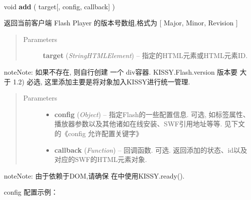 \documentclass[letterpaper,10pt,english]{sphinxmanual}
\begin{document}
\begin{fulllineitems}
\label{api/component/flash/flash-embed:flash.add}~
\begin{DUlineblock}{0em}
\item[] void \textbf{add} ( target{[}, config, callback{]} )
\item[] 返回当前客户端 Flash Player 的版本号数组,格式为 {[} Major, Minor, Revision {]}
\end{DUlineblock}
\begin{quote}\begin{description}
\item[{Parameters}] \leavevmode
\textbf{target} (\emph{String\textbar{}HTMLElement}) -- 指定的HTML元素或HTML元素ID.

\end{description}\end{quote}

\begin{notice}{note}{Note:}
如果不存在, 则自行创建 一个 div容器.  KISSY.Flash.version 版本要 大于 1.2) 必选, 这里添加主要是将对象加入KISSY进行统一管理.
\end{notice}
\begin{quote}\begin{description}
\item[{Parameters}] \leavevmode\begin{itemize}
\item {}
\textbf{config} (\emph{Object}) -- 指定Flash的一些配置信息.  可选, 如标签属性、播放器参数以及其他诸如在线安装、SWF引用地址等等.  见下文的《config 允许配置关键字》

\item {}
\textbf{callback} (\emph{Function}) -- 回调函数.  可选.  返回添加的状态、id以及对应的SWF的HTML元素对象.

\end{itemize}

\end{description}\end{quote}

\begin{notice}{note}{Note:}
由于依赖于DOM,请确保 在中使用KISSY.ready().
\end{notice}

config 配置示例：


\end{fulllineitems}
\end{document}
